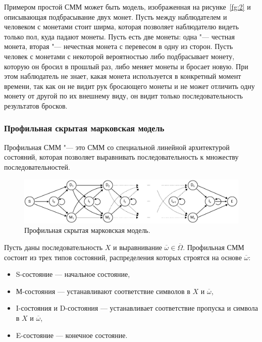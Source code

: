 \documentclass[specialist,
substylefile = spbu_report.rtx,
subf,href,colorlinks=true, 12pt]{disser}
\begin{document}
				Примером простой СММ может быть модель, изображенная на рисунке~\ref{fg:2} и описывающая подбрасывание двух монет. Пусть между наблюдателем и человеком с монетами стоит ширма, которая позволяет наблюдателю видеть только пол, куда падают монеты. Пусть есть две монеты: одна "--- честная монета, вторая "--- нечестная монета с перевесом в одну из сторон. Пусть человек с монетами с некоторой вероятностью либо подбрасывает монету, которую он бросил в прошлый раз, либо меняет монеты и бросает новую. При этом наблюдатель не знает, какая монета используется в конкретный момент времени, так как он не видит рук бросающего монеты и не может отличить одну монету от другой по их внешнему виду, он видит только последовательность результатов бросков.
				
			\subsubsection{Профильная скрытая марковская модель}
				Профильная СММ "--- это СММ со специальной линейной архитектурой состояний, которая позволяет выравнивать последовательность к множеству последовательностей.
				
				\begin{figure}[h]
					\centering
					\includegraphics[width=15cm]{figure2}
					\caption{Профильная скрытая марковская модель.}  \label{fg:3}
				\end{figure}
				
				Пусть даны последовательность $X$ и выравнивание $\overline{\omega} \in \overline{\Omega}$.	Профильная СММ состоит из трех типов состояний, распределения которых строятся на основе $\overline{\omega}$:
				\begin{itemize}
					\item S-состояние --- начальное состояние,
					\item М-состояния --- устанавливают соответствие символов в $X$ и $\overline{\omega}$,
					\item I-состояния и D-состояния --- устанавливает соответствие пропуска и символа в $X$ и $\overline{\omega}$,
					\item E-состояние --- конечное состояние.
				\end{itemize}
			
\end{document}
